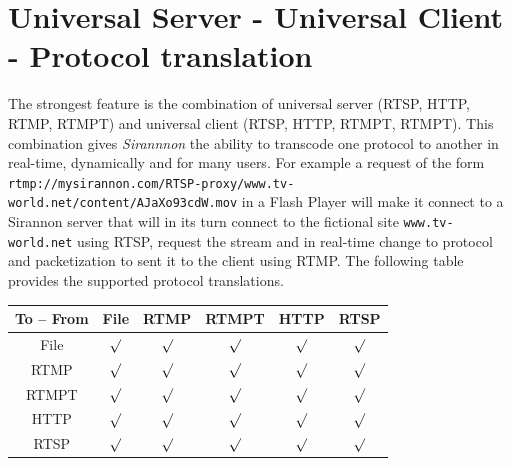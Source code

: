 \documentclass[12pt]{report}
\begin{document}
\section{Universal Server - Universal Client - Protocol translation}
The strongest feature is the combination of universal server (RTSP, HTTP, RTMP, RTMPT) and universal client (RTSP, HTTP, RTMPT, RTMPT). This combination gives \textit{Sirannnon} the ability to transcode one protocol to another in real-time, dynamically and for many users. For example a request of the form 
\\\texttt{rtmp://mysirannon.com/RTSP-proxy/www.tv-world.net/content/AJaXo93cdW.mov} in a Flash Player will make it connect to a Sirannon server that will in its turn connect to the fictional site \texttt{www.tv-world.net} using RTSP, request the stream and in real-time change to protocol and packetization to sent it to the client using RTMP. The following table provides the supported protocol translations.

\begin{small}\begin{center}
\begin{tabular}{|c|c|c|c|c|c|}
\hline To -- From & File & RTMP & RTMPT & HTTP & RTSP \\ 
\hline File & $\surd$ & $\surd$ & $\surd$ & $\surd$  & $\surd$ \\ 
\hline RTMP & $\surd$ & $\surd$ & $\surd$ & $\surd$ & $\surd$ \\ 
\hline RTMPT & $\surd$ & $\surd$ & $\surd$ & $\surd$ & $\surd$ \\ 
\hline HTTP & $\surd$ & $\surd$ & $\surd$ & $\surd$ & $\surd$ \\ 
\hline RTSP & $\surd$ & $\surd$ & $\surd$ & $\surd$ & $\surd$ \\
\hline 
\end{tabular} 
\end{center}\end{small}
\end{document}
